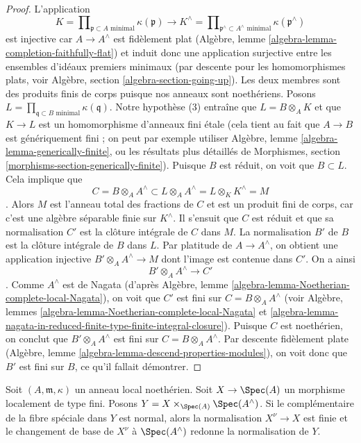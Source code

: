 \begin{proof}
\medskip\noindent L'application $$
K = \prod\nolimits_{\mathfrak p \subset A\text{ minimal}} \kappa(\mathfrak p)
\longrightarrow
K^\wedge = \prod\nolimits_{\mathfrak p^\wedge \subset A^\wedge\text{ minimal}}
\kappa(\mathfrak p^\wedge)
$$ est injective car $A \to A^\wedge$ est fidèlement plat (Algèbre, lemme \ref{algebra-lemma-completion-faithfully-flat}) et induit donc une application surjective entre les ensembles d'idéaux premiers minimaux (par descente pour les homomorphismes plats, voir Algèbre, section \ref{algebra-section-going-up}). Les deux membres sont des produits finis de corps puisque nos anneaux sont noethériens. Posons $L = \prod_{\mathfrak q \subset B\text{ minimal}} \kappa(\mathfrak q)$. Notre hypothèse (3) entraîne que $L = B \otimes_A K$ et que $K \to L$ est un homomorphisme d'anneaux fini \'etale (cela tient au fait que $A \to B$ est génériquement fini ; on peut par exemple utiliser Algèbre, lemme \ref{algebra-lemma-generically-finite}, ou les résultats plus détaillés de Morphismes, section \ref{morphisms-section-generically-finite}). Puisque $B$ est réduit, on voit que $B \subset L$. Cela implique que $$
C = B \otimes_A A^\wedge \subset
L \otimes_A A^\wedge = L \otimes_K K^\wedge = M
$$. Alors $M$ est l'anneau total des fractions de $C$ et est un produit fini de corps, car c'est une algèbre séparable finie sur $K^\wedge$. Il s'ensuit que $C$ est réduit et que sa normalisation $C'$ est la clôture intégrale de $C$ dans $M$. La normalisation $B'$ de $B$ est la clôture intégrale de $B$ dans $L$. Par platitude de $A \to A^\wedge$, on obtient une application injective $B' \otimes_A A^\wedge \to M$ dont l'image est contenue dans $C'$. On a ainsi $$
B' \otimes_A A^\wedge \longrightarrow C'
$$. Comme $A^\wedge$ est de Nagata (d'après Algèbre, lemme \ref{algebra-lemma-Noetherian-complete-local-Nagata}), on voit que $C'$ est fini sur $C = B \otimes_A A^\wedge$ (voir Algèbre, lemmes \ref{algebra-lemma-Noetherian-complete-local-Nagata} et \ref{algebra-lemma-nagata-in-reduced-finite-type-finite-integral-closure}). Puisque $C$ est noethérien, on conclut que $B' \otimes_A A^\wedge$ est fini sur $C = B \otimes_A A^\wedge$. Par descente fidèlement plate (Algèbre, lemme \ref{algebra-lemma-descend-properties-modules}), on voit donc que $B'$ est fini sur $B$, ce qu'il fallait démontrer. \end{proof}

\begin{lemma} \label{lemma-normalization-completion} Soit $(A, \mathfrak m, \kappa)$ un anneau local noethérien. Soit $X \to \Spec(A)$ un morphisme localement de type fini. Posons $Y = X \times_{\Spec(A)} \Spec(A^\wedge)$. Si le complémentaire de la fibre spéciale dans $Y$ est normal, alors la normalisation $X^\nu \to X$ est finie et le changement de base de $X^\nu$ à $\Spec(A^\wedge)$ redonne la normalisation de $Y$. \end{lemma}

